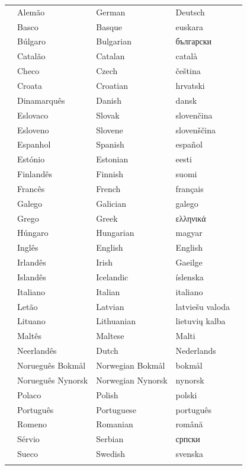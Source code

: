 \vspace*{-5mm}
\centering
  \setlength{\tabcolsep}{2em}
  \begin{tabularx}{\textwidth}{lllll} \toprule\addlinespace
  &Alemão & German & Deutsch& \\
  &Basco & Basque & euskara& \\
  &Búlgaro & Bulgarian & български& \\
  &Catalão & Catalan & català& \\
  &Checo & Czech & čeština& \\
  &Croata & Croatian & hrvatski& \\
  &Dinamarquês & Danish & dansk& \\
  &Eslovaco & Slovak & slovenčina& \\
  &Esloveno & Slovene & slovenščina& \\
  &Espanhol & Spanish & español& \\
  &Estónio & Estonian & eesti& \\
  &Finlandês & Finnish & suomi& \\
  &Francês & French & français& \\
  &Galego & Galician & galego& \\
  &Grego & Greek & ελληνικά& \\
  &Húngaro & Hungarian & magyar& \\
  &Inglês & English & English& \\
  &Irlandês & Irish & Gaeilge& \\
  &Islandês & Icelandic & íslenska& \\
  &Italiano & Italian & italiano& \\
  &Letão & Latvian & latviešu valoda& \\
  &Lituano & Lithuanian & lietuvių kalba& \\
  &Maltês & Maltese & Malti& \\
  &Neerlandês & Dutch & Nederlands& \\
  &Norueguês Bokmål & Norwegian Bokmål & bokmål& \\
  &Norueguês Nynorsk & Norwegian Nynorsk & nynorsk& \\
  &Polaco & Polish & polski& \\
  &Português & Portuguese & português& \\
  &Romeno & Romanian & română& \\
  &Sérvio & Serbian & српски& \\
  &Sueco & Swedish & svenska& \\ \addlinespace \bottomrule
\end{tabularx}
